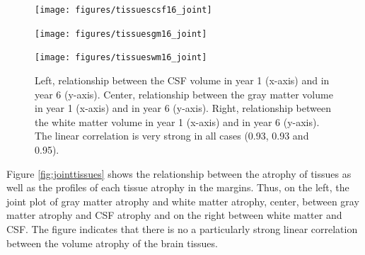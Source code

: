 \documentclass[11pt]{article}
\theoremstyle{definition}
\theoremstyle{remark}
\begin{document}
\begin{figure}[!htb]
    \centering
    \begin{minipage}{.32\textwidth}
        \centering
        \texttt{[image: figures/tissuescsf16\_joint]} %
    \end{minipage}%
    \hfill
    \begin{minipage}{0.32\textwidth}
        \centering
        \texttt{[image: figures/tissuesgm16\_joint]}
    \end{minipage}
    \hfill
    \begin{minipage}{0.32\textwidth}
        \centering
        \texttt{[image: figures/tissueswm16\_joint]}
    \end{minipage}
    \caption{Left, relationship between the CSF volume in year 1 (x-axis) and in year 6 (y-axis). Center, relationship between the gray matter volume in year 1 (x-axis) and in year 6 (y-axis). Right, relationship between the white matter volume in year 1 (x-axis) and in year 6 (y-axis). The linear correlation is very strong in all cases (0.93, 0.93 and 0.95).}
    \label{fig:jointtissuescont}
\end{figure}

Figure \ref{fig:jointtissues} shows the relationship between the atrophy of tissues as well as the profiles of each tissue atrophy in the margins. Thus, on the left, the joint plot of gray matter atrophy and white matter atrophy, center, between gray matter atrophy and CSF atrophy and on the right between white matter and CSF. The figure indicates that there is no a particularly strong linear correlation between the volume atrophy of the brain tissues. 
\end{document}

